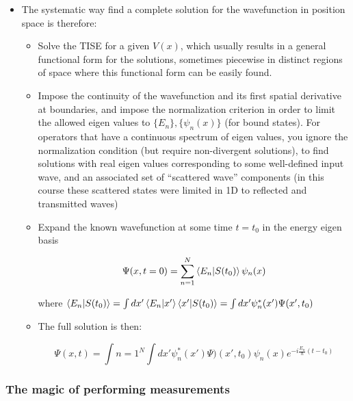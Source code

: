 \documentclass{article}
\begin{document}
\begin{itemize}
    \item The systematic way find a complete solution for the wavefunction in position space is therefore:
    
    \begin{itemize}
        \item Solve the TISE for a given $V(x)$, which usually results in a general functional form for the solutions, sometimes piecewise in distinct regions of space where this functional form can be easily found.
        
        \item Impose the continuity of the wavefunction and its first spatial derivative at boundaries, and impose the normalization criterion in order to limit the allowed eigen values to $\{E_n\}, \{\psi_n(x)\}$ (for bound states).  For operators that have a continuous spectrum of eigen values, you ignore the normalization condition (but require non-divergent solutions), to find solutions with real eigen values corresponding to some well-defined input wave, and an associated set of “scattered wave” components (in this course these scattered states were limited in 1D to reflected and transmitted waves)
        
        \item Expand the known wavefunction at some time $t = t_0$ in the energy eigen basis
        
        $$\Psi(x,t=0) = \sum_{n=1}^N \braket{E_n|S(t_0)} \psi_n(x)$$
        
        where $\braket{E_n|S(t_0)} = \int dx' \braket{E_n|x'} \braket{x'|S(t_0)} = \int dx' \psi_n^*(x') \Psi(x',t_0)$
        
        \item The full solution is then:
        
        $$\Psi(x,t) = \int{n=1}^N \int dx' \psi_n^*(x') \Psi)(x',t_0) \psi_n(x) e^{- i \frac{E_n}{\hbar} (t - t_0)}$$
    \end{itemize}

\end{itemize}

\subsubsection{The magic of performing measurements}
\end{document}
